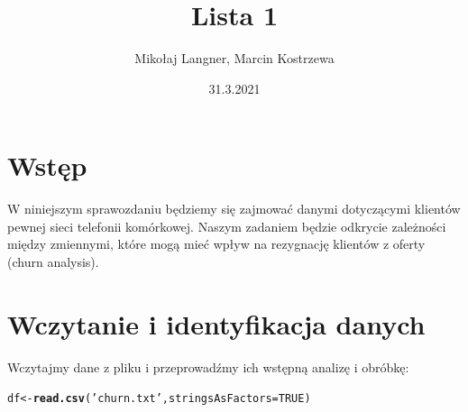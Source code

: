 \documentclass{article}\usepackage[]{graphicx}\usepackage[]{color}
\title{Lista 1}
\author{Mikołaj Langner, Marcin Kostrzewa}
\date{31.3.2021}
\makeatletter
\newcommand{\hlnum}[1]{\textcolor[rgb]{0.686,0.059,0.569}{#1}}%
\newcommand{\hlstr}[1]{\textcolor[rgb]{0.192,0.494,0.8}{#1}}%
\newcommand{\hlstd}[1]{\textcolor[rgb]{0.345,0.345,0.345}{#1}}%
\newcommand{\hlkwb}[1]{\textcolor[rgb]{0.69,0.353,0.396}{#1}}%
\newcommand{\hlkwc}[1]{\textcolor[rgb]{0.333,0.667,0.333}{#1}}%
\newcommand{\hlkwd}[1]{\textcolor[rgb]{0.737,0.353,0.396}{\textbf{#1}}}%
\newenvironment{kframe}{%
 \def\at@end@of@kframe{}%
 \ifinner\ifhmode%
  \def\at@end@of@kframe{\end{minipage}}%
  \begin{minipage}{\columnwidth}%
 \fi\fi%
 \def\FrameCommand##1{\hskip\@totalleftmargin \hskip-\fboxsep
 \colorbox{shadecolor}{##1}\hskip-\fboxsep
     \hskip-\linewidth \hskip-\@totalleftmargin \hskip\columnwidth}%
 \MakeFramed {\advance\hsize-\width
   \@totalleftmargin\z@ \linewidth\hsize
   \@setminipage}}%
 {\par\unskip\endMakeFramed%
 \at@end@of@kframe}
\newenvironment{knitrout}{}{} %
\makeatother
\begin{document}
\maketitle

\section{Wstęp}
W niniejszym sprawozdaniu będziemy się zajmować danymi dotyczącymi klientów pewnej sieci telefonii komórkowej.
Naszym zadaniem będzie odkrycie zależności między zmiennymi, które mogą mieć wpływ na rezygnację klientów z oferty (churn analysis).

\section{Wczytanie i identyfikacja danych}
Wczytajmy dane z pliku i przeprowadźmy ich wstępną analizę i obróbkę:

\begin{knitrout}
\color{fgcolor}\begin{kframe}
\begin{alltt}
\hlstd{df} \hlkwb{<-} \hlkwd{read.csv}\hlstd{(}\hlstr{'churn.txt'}\hlstd{,} \hlkwc{stringsAsFactors} \hlstd{=} \hlnum{TRUE}\hlstd{)}
\end{alltt}
\end{kframe}
\end{knitrout}
\end{document}
